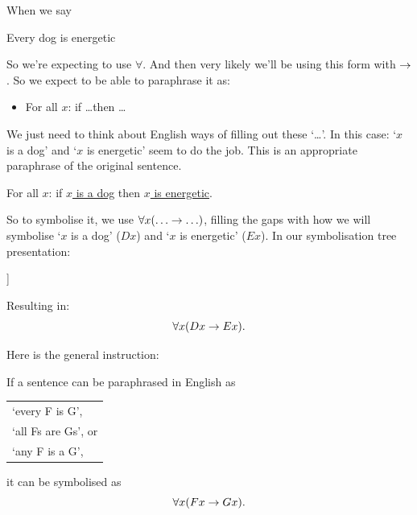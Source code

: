 When we say 
\begin{samplesent}
	\item\label{sent:q:dog} Every dog is energetic
\end{samplesent}
So we're expecting to use $\forall$. And then very likely we'll be using this form with $\rightarrow$. 
So we expect to be able to paraphrase it as:
\begin{itemize}
	\item[] For all $x$: if \ldots then \ldots
\end{itemize}
We just need to think about English ways of filling out these `\ldots'. In this case: `$x$ is a dog' and `$x$ is energetic' seem to do the job. This is an appropriate paraphrase of the original sentence. 
\begin{samplesent}
	\item[] For all $x$: if \underline{$x$ is a dog} then \underline{$x$ is energetic}.
\end{samplesent}
So to symbolise it, we use $\forall x(\ldots\eif \ldots)$, filling the gaps with how we will symbolise `$x$ is a dog' ($Dx$) and `$x$ is energetic' ($Ex$). In our symbolisation tree presentation:
\begin{center}
	\begin{forest}
		[ Every dog is energetic\\
		For all $x$: if \ldots then \ldots\\
		$\forall x(\ldots\eif\ldots)$
		[$x$ is a dog\\$Dx$]
		[$x$ is energetic\\$Ex$]
		]
	\end{forest}
\end{center}
Resulting in: $$\forall x(Dx\rightarrow Ex).$$ 


Here is the general instruction:

\begin{highlighted}
	If a sentence can be paraphrased in English as \begin{center}
		\begin{tabular}{l}`every F is G',\\`all Fs are Gs', or\\ `any F is a G',
		\end{tabular}
	\end{center} it can be symbolised as $$\forall x (Fx \rightarrow Gx).$$
\end{highlighted}

